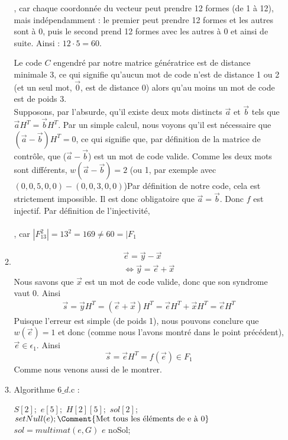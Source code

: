 \documentclass[10p,a4paper]{scrartcl}
\renewcommand{\(}{\left(}
\renewcommand{\)}{\right)}
\begin{document}
\begin{enumerate}
\begin{enumerate}
						, car chaque coordonnée du vecteur peut prendre 12 formes (de 1 à 12), mais indépendamment : le premier peut prendre 12 formes et les autres sont à 0, puis le second prend 12 formes avec les autres à 0 et ainsi de suite. Ainsi : $12\cdot 5 = 60$.
						
						Le code $C$ engendré par notre matrice génératrice est de distance minimale 3, ce qui signifie qu'aucun mot de code n'est de distance 1 ou 2 (et un seul mot, $\vec{0}$, est de distance 0) alors qu'au moins un mot de code est de poids 3.\\
						Supposons, par l'absurde, qu'il existe deux mots distincts $\vec{a}$ et $\vec{b}$ tels que $\vec{a}H^T = \vec{b}H^T$. Par un simple calcul, nous voyons qu'il est nécessaire que $(\vec{a}-\vec{b})H^T = 0$, ce qui  signifie que, par définition de la matrice de contrôle, que ($\vec{a}-\vec{b}$) est un mot de code valide. Comme les deux mots sont différents, $w(\vec{a} - \vec{b}) = 2$ \big(ou 1, par exemple avec $(0,0,5,0,0)-(0,0,3,0,0)$\big)Par définition de notre code, cela est strictement impossible. Il est donc obligatoire que $\vec{a} = \vec{b}$. Donc $f$ est injectif. Par définition de l'injectivité,  \\ \\
						, car $|F_{13}^2| = 13^2 = 169 \neq 60 = |\textit{F}_1$ 
					
				\item 	\begin{align*}
								\vec{e} = \vec{y} - \vec{x}\\
								 \iff \vec{y} = \vec{e} + \vec{x}
						\end{align*}
						Nous savons que $\vec{x}$ est un mot de code valide, donc que son syndrome vaut 0. Ainsi 
						\begin{align*}
							\vec{s} = \vec{y}H^T = (\vec{e} + \vec{x})H^T = \vec{e}H^T + \vec{x}H^T = \vec{e}H^T
						\end{align*}
						Puisque l'erreur est simple (de poids 1), nous pouvons conclure que $w(\vec{e}) = 1$ et donc (comme nous l'avons montré dans le point précédent), $\vec{e} \in \epsilon_1$. Ainsi
						\[\vec{s} = \vec{e}H^T = f(\vec{e}) \in \textit{F}_1\] Comme nous venons aussi de le montrer.
						\newpage
				\item	\begin{algorithm}
							\caption{Algorithme $6\_d$.c :}
							\begin{algorithmic}
								\State $S[2];$
								\State $e[5];$
								\State $H[2][5];$
								\State $sol[2];$
									\State $setNull(e); \Comment{\text{Met tous les éléments de e à 0}}$
										\State $sol = multimat(e, G)$
											\State \Return $e$
										\EndIf
									\EndFor 
								\EndFor
								\State \Return noSol;
							\end{algorithmic}
						\end{algorithm}
						

\end{enumerate}
\end{enumerate}
\end{document}
